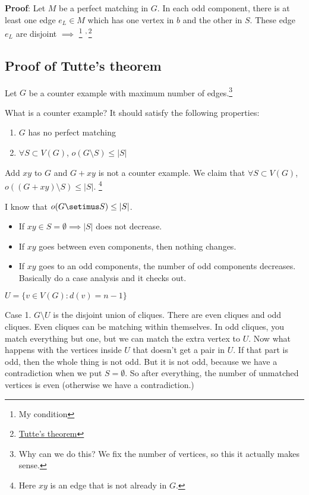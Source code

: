 \documentclass[11pt]{article}
\begin{document}
\textbf{Proof}: Let \(M\) be a perfect matching in \(G\). In each odd component, there
is at least one edge \(e_L \in M\) which has one vertex in \(b\) and the other in
\(S\). These edge \(e_L\) are disjoint \(\implies\) \footnote{My condition} \textsuperscript{,}\,\footnote{\href{https://en.wikipedia.org/wiki/Tutte\_theorem}{Tutte's theorem}}
\subsection{Proof of Tutte's theorem}
\label{sec:orgc773fb8}
Let \(G\) be a counter example with maximum number of edges.\footnote{Why can we do this? We fix the number of vertices, so this it actually
makes sense.}

What is a counter example? It should satisfy the following properties:
\begin{enumerate}
\item \(G\) has no perfect matching
\item \(\forall S \subset V(G)\), \(o(G \setminus S) \le \vert S \vert\)
\end{enumerate}

Add \(xy\) to \(G\) and \(G+xy\) is not a counter example. We claim that \(\forall S
   \subset V(G)\), \(o((G+xy)\setminus S) \le \vert S \vert\). \footnote{Here \(xy\) is an edge that is not already in \(G\).}

I know that \(o(G\setimus S) \le \vert S \vert\).
\begin{itemize}
\item If \(xy \in S = \emptyset \implies \vert S \vert\) does not decrease.
\item If \(xy\) goes between even components, then nothing changes.
\item If \(xy\) goes to an odd components, the number of odd components decreases.
Basically do a case analysis and it checks out.
\end{itemize}

\(U = \{v \in V(G) \colon d(v) = n- 1\}\)

Case 1. \(G \setminus U\) is the disjoint union of cliques. There are even
cliques and odd cliques. Even cliques can be matching within themselves. In
odd cliques, you match everything but one, but we can match the extra vertex
to \(U\). Now what happens with the vertices inside \(U\) that doesn't get a pair
in \(U\). If that part is odd, then the whole thing is not odd. But it is not
odd, because we have a contradiction when we put \(S = \emptyset\). So after
everything, the number of unmatched vertices is even (otherwise we have a
contradiction.)
\end{document}
